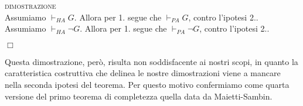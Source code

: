 	\textsc{dimostrazione}\\
 	Assumiamo $\vdash_{HA}G$. Allora per 1. segue che $\vdash_{PA} G$, contro l'ipotesi 2..
	Assumiamo $\vdash_{HA}\neg G$. Allora per 1. segue che $\vdash_{PA} \neg G$, contro l'ipotesi 2..
	\begin{flushright}$\Box$\end{flushright}
	Questa dimostrazione, per\`{o}, risulta non soddisfacente ai nostri scopi, in quanto la caratteristica costruttiva che delinea le nostre dimostrazioni viene a mancare nella seconda ipotesi del teorema. Per questo motivo confermiamo come quarta versione del primo teorema di completezza quella data da Maietti-Sambin.
